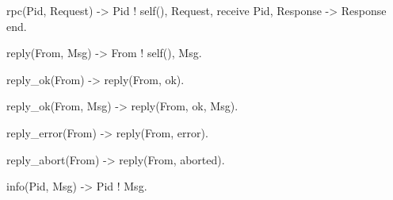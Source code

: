 \documentclass[11pt]{article}
\renewenvironment{verbatim}{}{}
\begin{document}
\begin{verbatim}
rpc(Pid, Request) ->
    Pid ! {self(), Request},
    receive
        {Pid, Response} -> Response
    end.

reply(From,  Msg) ->
    From ! {self(), Msg}.

reply_ok(From) ->
    reply(From, ok).

reply_ok(From, Msg) ->
    reply(From, {ok, Msg}).

reply_error(From) ->
    reply(From, error).

reply_abort(From) -> %Changed this to only take From
    reply(From, aborted).

%% asynchronous communication

info(Pid, Msg) ->
    Pid ! Msg.


%%%-------------------------------------------------------------------
%%% Internal Implementation
%%%-------------------------------------------------------------------

% Your implementation of the atomic transaction server.


\end{verbatim}
\end{verbatim}

\newpage
\end{document}
